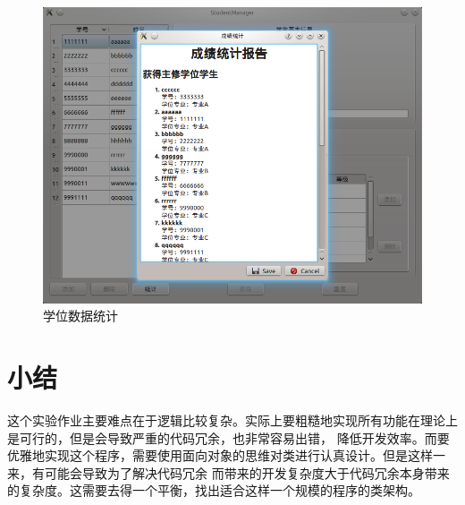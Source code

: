 \documentclass[adobefonts,a4paper]{ctexart}
\begin{document}
\begin{figure}[htb!]
 \centering
 \includegraphics[scale=0.5]{DegStat}
 \caption{学位数据统计} \label{fig:DegStat}
\end{figure}

\section{小结}
这个实验作业主要难点在于逻辑比较复杂。实际上要粗糙地实现所有功能在理论上是可行的，但是会导致严重的代码冗余，也非常容易出错，
降低开发效率。而要优雅地实现这个程序，需要使用面向对象的思维对类进行认真设计。但是这样一来，有可能会导致为了解决代码冗余
而带来的开发复杂度大于代码冗余本身带来的复杂度。这需要去得一个平衡，找出适合这样一个规模的程序的类架构。
\end{document}
